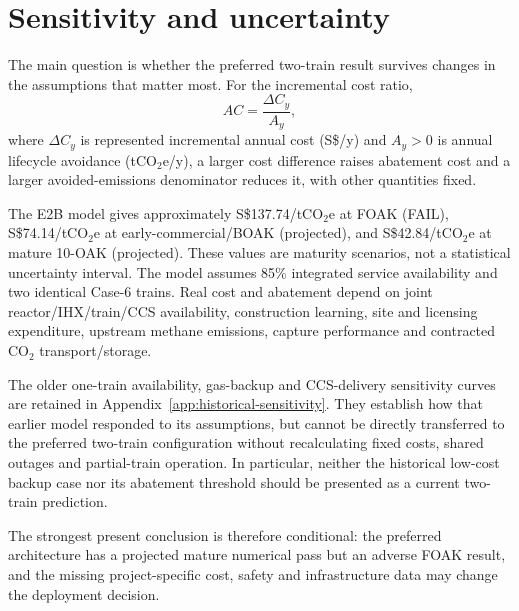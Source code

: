 \section{Sensitivity and uncertainty}\label{sec:sensitivity}
The main question is whether the preferred two-train result survives changes in the assumptions that matter most. For the incremental cost ratio,
\[
AC=\frac{\Delta C_y}{A_y},
\]
where $\Delta C_y$ is represented incremental annual cost (S\$/y) and $A_y>0$ is annual lifecycle avoidance (tCO$_2$e/y), a larger cost difference raises abatement cost and a larger avoided-emissions denominator reduces it, with other quantities fixed.

The E2B model gives approximately S\$137.74/tCO$_2$e at FOAK (FAIL), S\$74.14/tCO$_2$e at early-commercial/BOAK (projected), and S\$42.84/tCO$_2$e at mature 10-OAK (projected). These values are maturity scenarios, not a statistical uncertainty interval. The model assumes 85\% integrated service availability and two identical Case-6 trains. Real cost and abatement depend on joint reactor/IHX/train/CCS availability, construction learning, site and licensing expenditure, upstream methane emissions, capture performance and contracted CO$_2$ transport/storage.

The older one-train availability, gas-backup and CCS-delivery sensitivity curves are retained in Appendix~\ref{app:historical-sensitivity}. They establish how that earlier model responded to its assumptions, but cannot be directly transferred to the preferred two-train configuration without recalculating fixed costs, shared outages and partial-train operation. In particular, neither the historical low-cost backup case nor its abatement threshold should be presented as a current two-train prediction.

The strongest present conclusion is therefore conditional: the preferred architecture has a projected mature numerical pass but an adverse FOAK result, and the missing project-specific cost, safety and infrastructure data may change the deployment decision.
